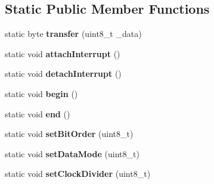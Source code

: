 \subsection*{Static Public Member Functions}
\begin{DoxyCompactItemize}
\item 
static byte {\bfseries transfer} (uint8\+\_\+t \+\_\+data)\hypertarget{class_wasp_s_p_i_a6d307d6a35eb53a851ada04f915b3d3e}{}\label{class_wasp_s_p_i_a6d307d6a35eb53a851ada04f915b3d3e}

\item 
static void {\bfseries attach\+Interrupt} ()\hypertarget{class_wasp_s_p_i_ac7c1ac6a712af71bd3d42b31888b819d}{}\label{class_wasp_s_p_i_ac7c1ac6a712af71bd3d42b31888b819d}

\item 
static void {\bfseries detach\+Interrupt} ()\hypertarget{class_wasp_s_p_i_a5e7e52ecf06a82279056d1827c2b4a01}{}\label{class_wasp_s_p_i_a5e7e52ecf06a82279056d1827c2b4a01}

\item 
static void {\bfseries begin} ()\hypertarget{class_wasp_s_p_i_a1bfe2d684a620435b8a18bd2ced40f71}{}\label{class_wasp_s_p_i_a1bfe2d684a620435b8a18bd2ced40f71}

\item 
static void {\bfseries end} ()\hypertarget{class_wasp_s_p_i_aea6fff483a300415a9cf6e23168e25ce}{}\label{class_wasp_s_p_i_aea6fff483a300415a9cf6e23168e25ce}

\item 
static void {\bfseries set\+Bit\+Order} (uint8\+\_\+t)\hypertarget{class_wasp_s_p_i_a0f23ee5aa1fc479b4181df4aaccc99aa}{}\label{class_wasp_s_p_i_a0f23ee5aa1fc479b4181df4aaccc99aa}

\item 
static void {\bfseries set\+Data\+Mode} (uint8\+\_\+t)\hypertarget{class_wasp_s_p_i_af7657b30368151ca8f939785bd6a0823}{}\label{class_wasp_s_p_i_af7657b30368151ca8f939785bd6a0823}

\item 
static void {\bfseries set\+Clock\+Divider} (uint8\+\_\+t)\hypertarget{class_wasp_s_p_i_a33af3ccd2b47a1cd1bdde844248ce2f0}{}\label{class_wasp_s_p_i_a33af3ccd2b47a1cd1bdde844248ce2f0}

\end{DoxyCompactItemize}

